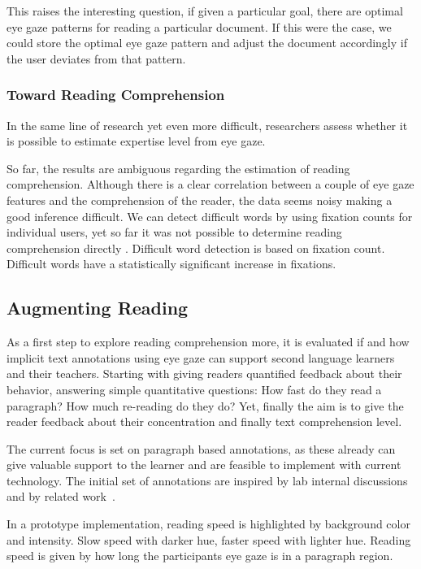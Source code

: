 \documentclass[journal]{IEEEtran}
\begin{document}
\begin{figure*}
This raises the interesting question, if given a particular goal, there are optimal eye gaze patterns for reading a particular document. 
If this were the case, we could store the optimal eye gaze pattern and adjust the document accordingly if the user deviates from that pattern. 

\subsubsection{Toward Reading Comprehension}
In the same line of research yet even more difficult, researchers assess whether it is possible to estimate expertise level from eye gaze. 

So far, the results are ambiguous regarding the estimation of reading comprehension. 
Although there is a clear correlation between a couple of eye gaze features and the comprehension of the reader, the data seems noisy making a good inference difficult. 
We can detect difficult words by using fixation counts for individual users, yet so far it was not possible to determine reading comprehension directly \cite{kunze2013activity}.
Difficult word detection is based on fixation count.
Difficult words have a statistically significant increase in fixations. 

\subsection{Augmenting Reading}
As a first step to explore reading comprehension more, it is evaluated if and how implicit text annotations using eye gaze can support second language learners and their teachers. 
Starting with giving readers quantified feedback about their behavior, answering simple quantitative questions: 
How fast do they read a paragraph? 
How much re-reading do they do? 
Yet, finally the aim is to give the reader feedback about their concentration and finally text comprehension level.

The current focus is set on paragraph based annotations, as these already can give valuable support to the learner and are feasible to implement with current technology. 
The initial set of annotations are inspired by lab internal discussions and by related work~\cite{Buscher:2008:GUG:1358628.1358805}.

In a prototype implementation, reading speed is highlighted by background color and intensity.
Slow speed with darker hue, faster speed with lighter hue. 
Reading speed is given by how long the participants eye gaze is in a paragraph region.


\end{figure*}
\end{document}
